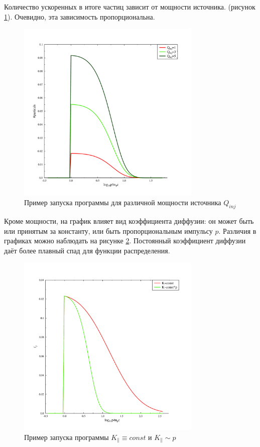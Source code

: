 \documentclass[a4paper,14pt]{extarticle} %
\begin{document}
Количество ускоренных в итоге частиц зависит от мощности источника. (рисунок \ref{res/razn/Qinj}). Очевидно, эта зависимость пропорциональна.
\begin{figure}[H]
\centering
\includegraphics[width=250pt]{r_Qinj}
\caption{Пример запуска программы для различной мощности источника $Q_{inj}$}
\label{res/razn/Qinj}
\end{figure}

Кроме мощности, на график влияет вид коэффициента диффузии: он может быть или принятым за константу, или быть пропорциональным импульсу $p$. Различия в графиках можно наблюдать на рисунке \ref{res/razn/bom}. Постоянный коэффициент диффузии даёт более плавный спад для функции распределения.

\begin{figure}[H]
\centering
\includegraphics[width=250pt]{r_bom_or_not}
\caption{Пример запуска программы $K_\parallel\equiv const$ и $K_\parallel \sim p $}
\label{res/razn/bom}
\end{figure}
\end{document}
